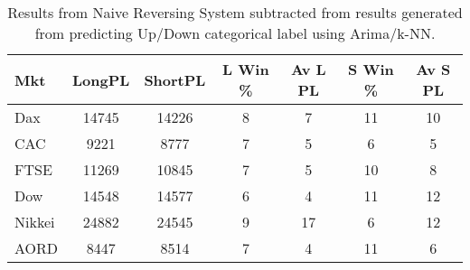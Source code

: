 \begin{table}[ht]
\centering
\caption[Predicting UpDn CAT - Arima/k-NN predictions passed to System 4 - ]{Results from Naive Reversing System subtracted from results generated from predicting Up/Down categorical label using Arima/k-NN.} 
\label{tab:chp_ts:pUD_CAT_arima_knn_sys_diff}
\begin{tabular}{lcccccc}
  \toprule Mkt & LongPL & ShortPL & L Win \% & Av L PL & S Win \% & Av S PL \\ 
  \midrule Dax & 14745 & 14226 & 8 & 7 & 11 & 10 \\ 
  CAC & 9221 & 8777 & 7 & 5 & 6 & 5 \\ 
  FTSE & 11269 & 10845 & 7 & 5 & 10 & 8 \\ 
  Dow & 14548 & 14577 & 6 & 4 & 11 & 12 \\ 
  Nikkei & 24882 & 24545 & 9 & 17 & 6 & 12 \\ 
  AORD & 8447 & 8514 & 7 & 4 & 11 & 6 \\ 
   \bottomrule \end{tabular}
\end{table}
